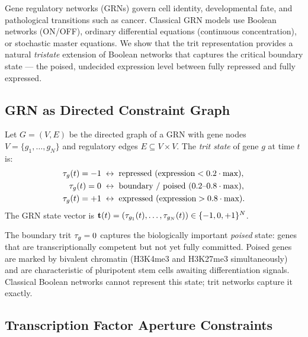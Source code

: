 Gene regulatory networks (GRNs) govern cell identity, developmental fate,
and pathological transitions such as cancer.  Classical GRN models use
Boolean networks (ON/OFF), ordinary differential equations (continuous
concentration), or stochastic master equations.  We show that the trit
representation provides a natural \emph{tristate} extension of Boolean
networks that captures the critical boundary state --- the poised,
undecided expression level between fully repressed and fully expressed.

\subsection{GRN as Directed Constraint Graph}

\begin{definition}
\label{def:ch05-grn-trit}
Let $G = (V, E)$ be the directed graph of a GRN with gene nodes $V =
\{g_1, \ldots, g_N\}$ and regulatory edges $E \subseteq V \times V$.
The \emph{trit state} of gene $g$ at time $t$ is:
\begin{align}
\label{eq:ch05-grn-trit}
    \tau_g(t) = -1 &\;\leftrightarrow\; \text{repressed (expression} < 0.2 \cdot \text{max}), \\
    \tau_g(t) =  0 &\;\leftrightarrow\; \text{boundary / poised } (0.2\text{--}0.8 \cdot \text{max}), \\
    \tau_g(t) = +1 &\;\leftrightarrow\; \text{expressed (expression} > 0.8 \cdot \text{max}).
\end{align}
The GRN state vector is $\mathbf{t}(t) = (\tau_{g_1}(t), \ldots,
\tau_{g_N}(t)) \in \{-1,0,+1\}^N$.
\end{definition}

The boundary trit $\tau_g = 0$ captures the biologically important
\emph{poised} state: genes that are transcriptionally competent but
not yet fully committed.  Poised genes are marked by bivalent chromatin
(H3K4me3 and H3K27me3 simultaneously) and are characteristic of pluripotent
stem cells awaiting differentiation signals.  Classical Boolean networks
cannot represent this state; trit networks capture it exactly.

\subsection{Transcription Factor Aperture Constraints}


